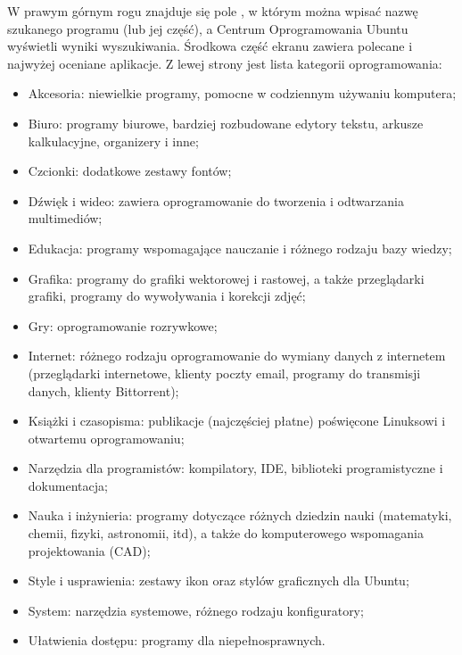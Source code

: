W prawym górnym rogu znajduje się pole , w którym można wpisać nazwę szukanego programu (lub jej część), a Centrum Oprogramowania Ubuntu wyświetli wyniki wyszukiwania. Środkowa część ekranu zawiera polecane i najwyżej oceniane aplikacje. Z lewej strony  jest lista kategorii oprogramowania:
\begin{itemize}
\item \textcolor{ubuntu_orange}{Akcesoria}: niewielkie programy, pomocne w codziennym używaniu komputera;
\item \textcolor{ubuntu_orange}{Biuro}: programy biurowe, bardziej rozbudowane edytory tekstu, arkusze kalkulacyjne, organizery i inne;
\item \textcolor{ubuntu_orange}{Czcionki}: dodatkowe zestawy fontów;
\item \textcolor{ubuntu_orange}{Dźwięk i wideo}: zawiera oprogramowanie do tworzenia i odtwarzania multimediów;
\item \textcolor{ubuntu_orange}{Edukacja}: programy wspomagające nauczanie i różnego rodzaju bazy wiedzy;
\item \textcolor{ubuntu_orange}{Grafika}: programy do grafiki wektorowej i rastowej, a także przeglądarki grafiki, programy do wywoływania i korekcji zdjęć;
\item \textcolor{ubuntu_orange}{Gry}: oprogramowanie rozrywkowe;
\item \textcolor{ubuntu_orange}{Internet}: różnego rodzaju oprogramowanie do wymiany danych z internetem (przeglądarki internetowe, klienty poczty email, programy do transmisji danych, klienty Bittorrent);
\item \textcolor{ubuntu_orange}{Książki i czasopisma}: publikacje (najczęściej płatne) poświęcone Linuksowi i otwartemu oprogramowaniu;
\item \textcolor{ubuntu_orange}{Narzędzia dla programistów}: kompilatory, IDE, biblioteki programistyczne i dokumentacja;
\item \textcolor{ubuntu_orange}{Nauka i inżynieria}: programy dotyczące różnych dziedzin nauki (matematyki, chemii, fizyki, astronomii, itd), a także do komputerowego wspomagania projektowania (CAD);
\item \textcolor{ubuntu_orange}{Style i usprawienia}: zestawy ikon oraz stylów graficznych dla Ubuntu;
\item \textcolor{ubuntu_orange}{System}: narzędzia systemowe, różnego rodzaju konfiguratory;
\item \textcolor{ubuntu_orange}{Ułatwienia dostępu}: programy dla niepełnosprawnych.
\end{itemize}

